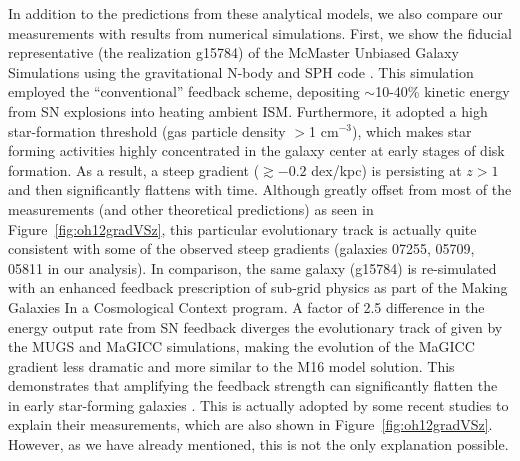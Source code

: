 In addition to the predictions from these analytical models, we also compare our measurements
with results from numerical simulations.  First, we show the fiducial representative (\ie the
realization g15784) of the McMaster Unbiased Galaxy Simulations
\citep[MUGS,][]{Stinson:2010ix} using the gravitational N-body and SPH code \gasoline.  This
simulation employed the ``conventional'' feedback scheme, \ie depositing $\sim$10-40\%
kinetic energy from SN explosions into heating ambient ISM. Furthermore, it adopted a high
star-formation threshold (gas particle density $>$1 cm$^{-3}$), which makes star forming
activities highly concentrated in the galaxy center at early stages of disk formation.  As a
result, a steep gradient (\ie $\gtrsim-0.2$ dex/kpc) is persisting at $z>1$ and then
significantly flattens with time.  Although greatly offset from most of the measurements (and
other theoretical predictions) as seen in Figure~\ref{fig:oh12gradVSz}, this particular
evolutionary track is actually quite consistent with some of the observed steep gradients
(galaxies 07255, 05709, 05811 in our analysis).  In comparison, the same galaxy (g15784) is
re-simulated with an enhanced feedback prescription of sub-grid physics as part of the Making
Galaxies In a Cosmological Context \citep[MaGICC,][]{Stinson:2013ex} program.  A factor of
2.5 difference in the energy output rate from SN feedback diverges the evolutionary track of
\mgs given by the MUGS and MaGICC simulations, making the evolution of the MaGICC gradient
less dramatic and more similar to the M16 model solution.  This demonstrates that amplifying
the feedback strength can significantly flatten the \mgs in early star-forming galaxies
\citep{Gibson:2013jw}.
This is actually adopted by some recent studies \citep{2015arXiv150901279L,Wuyts:2016th} to
explain their \mg measurements, which are also shown in Figure~\ref{fig:oh12gradVSz}.
However, as we have already mentioned, this is not the only explanation possible.


